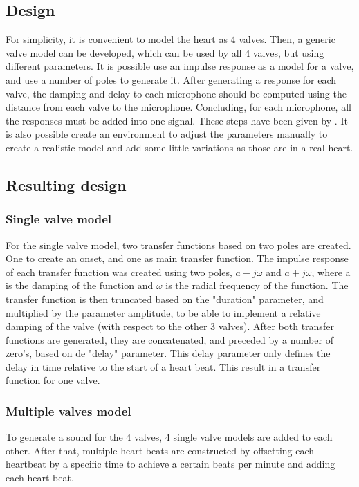 \subsection{Design}
For simplicity, it is convenient to model the heart as 4 valves. Then, a generic valve model can be developed, which can be used by all 4 valves, but using different parameters. It is possible use an impulse response as a model for a valve, and use a number of poles to generate it. After generating a response for each valve, the damping and delay to each microphone should be computed using the distance from each valve to the microphone. Concluding, for each microphone, all the responses must be added into one signal. These steps have been given by \cite{IP3Man}. It is also possible create an environment to adjust the parameters manually to create a realistic model and add some little variations as those are in a real heart.

\subsection{Resulting design}
\subsubsection{Single valve model}
For the single valve model, two transfer functions based on two poles are created. One to create an onset, and one as main transfer function. The impulse response of each transfer function was created using two poles, $a-j\omega$ and $a+j\omega$, where a is the damping of the function and $\omega$ is the radial frequency of the function. The transfer function is then truncated based on the "duration" parameter, and multiplied by the parameter amplitude, to be able to implement a relative damping of the valve (with respect to the other 3 valves). After both transfer functions are generated, they are concatenated, and preceded by a number of zero's, based on de "delay" parameter. This delay parameter only defines the delay in time relative to the start of a heart beat. This result in a transfer function for one valve.

\subsubsection{Multiple valves model}
To generate a sound for the 4 valves, 4 single valve models are added to each other. After that, multiple heart beats are constructed by offsetting each heartbeat by a specific time to achieve a certain beats per minute and adding each heart beat.

